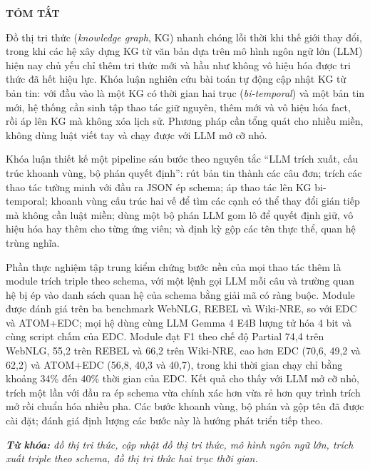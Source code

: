 \thispagestyle{empty}
\begin{center}
\fontsize{13pt}{1pt}\selectfont
    \textbf{TÓM TẮT}
\end{center}

\fontsize{13pt}{1pt}\selectfont

Đồ thị tri thức (\textit{knowledge graph}, KG) nhanh chóng lỗi thời khi thế giới thay đổi,
trong khi các hệ xây dựng KG từ văn bản dựa trên mô hình ngôn ngữ lớn (LLM) hiện nay chủ yếu chỉ thêm tri thức mới
và hầu như không vô hiệu hóa được tri thức đã hết hiệu lực.
Khóa luận nghiên cứu bài toán tự động cập nhật KG từ bản tin:
với đầu vào là một KG có thời gian hai trục (\textit{bi-temporal}) và một bản tin mới,
hệ thống cần sinh tập thao tác giữ nguyên, thêm mới và vô hiệu hóa fact, rồi áp lên KG mà không xóa lịch sử.
Phương pháp cần tổng quát cho nhiều miền, không dùng luật viết tay và chạy được với LLM mở cỡ nhỏ.

Khóa luận thiết kế một pipeline sáu bước theo nguyên tắc ``LLM trích xuất, cấu trúc khoanh vùng, bộ phán quyết định'':
rút bản tin thành các câu đơn;
trích các thao tác tường minh với đầu ra JSON ép schema;
áp thao tác lên KG bi-temporal;
khoanh vùng cấu trúc hai vế để tìm các cạnh có thể thay đổi gián tiếp mà không cần luật miền;
dùng một bộ phán LLM gom lô để quyết định giữ, vô hiệu hóa hay thêm cho từng ứng viên;
và định kỳ gộp các tên thực thể, quan hệ trùng nghĩa.

Phần thực nghiệm tập trung kiểm chứng bước nền của mọi thao tác thêm là module trích triple theo schema,
với một lệnh gọi LLM mỗi câu và trường quan hệ bị ép vào danh sách quan hệ của schema bằng giải mã có ràng buộc.
Module được đánh giá trên ba benchmark WebNLG, REBEL và Wiki-NRE, so với EDC và ATOM+EDC;
mọi hệ dùng cùng LLM Gemma 4 E4B lượng tử hóa 4 bit và cùng script chấm của EDC.
Module đạt F1 theo chế độ Partial 74,4 trên WebNLG, 55,2 trên REBEL và 66,2 trên Wiki-NRE,
cao hơn EDC (70,6, 49,2 và 62,2) và ATOM+EDC (56,8, 40,3 và 40,7),
trong khi thời gian chạy chỉ bằng khoảng 34\% đến 40\% thời gian của EDC.
Kết quả cho thấy với LLM mở cỡ nhỏ, trích một lần với đầu ra ép schema vừa chính xác hơn vừa rẻ hơn quy trình trích mở rồi chuẩn hóa nhiều pha.
Các bước khoanh vùng, bộ phán và gộp tên đã được cài đặt; đánh giá định lượng các bước này là hướng phát triển tiếp theo.

\textit{\textbf{Từ khóa:} đồ thị tri thức, cập nhật đồ thị tri thức, mô hình ngôn ngữ lớn, trích xuất triple theo schema, đồ thị tri thức hai trục thời gian.}
